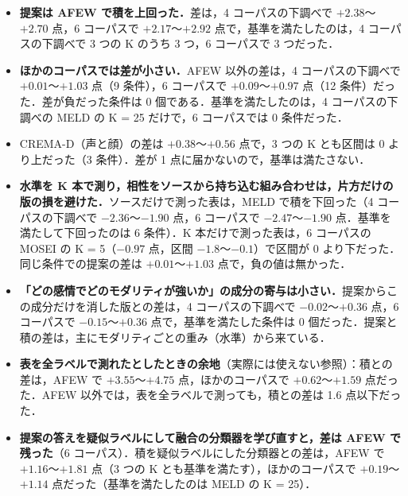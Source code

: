 \begin{itemize}
\item \textbf{提案は AFEW で積を上回った．}差は，4 コーパスの下調べで $+2.38$〜$+2.70$ 点，6 コーパスで $+2.17$〜$+2.92$ 点で，基準を満たしたのは，4 コーパスの下調べで 3 つの K のうち 3 つ，6 コーパスで 3 つだった．
\item \textbf{ほかのコーパスでは差が小さい．}AFEW 以外の差は，4 コーパスの下調べで $+0.01$〜$+1.03$ 点（9 条件），6 コーパスで $+0.09$〜$+0.97$ 点（12 条件）だった．差が負だった条件は 0 個である．基準を満たしたのは，4 コーパスの下調べの MELD の K = 25 だけで，6 コーパスでは 0 条件だった．
\item CREMA-D（声と顔）の差は $+0.38$〜$+0.56$ 点で，3 つの K とも区間は 0 より上だった（3 条件）．差が 1 点に届かないので，基準は満たさない．
\item \textbf{水準を K 本で測り，相性をソースから持ち込む組み合わせは，片方だけの版の損を避けた．}ソースだけで測った表は，MELD で積を下回った（4 コーパスの下調べで $-2.36$〜$-1.90$ 点，6 コーパスで $-2.47$〜$-1.90$ 点．基準を満たして下回ったのは 6 条件）．K 本だけで測った表は，6 コーパスの MOSEI の K = 5（$-0.97$ 点，区間 $-1.8$〜$-0.1$）で区間が 0 より下だった．同じ条件での提案の差は $+0.01$〜$+1.03$ 点で，負の値は無かった．
\item \textbf{「どの感情でどのモダリティが強いか」の成分の寄与は小さい．}提案からこの成分だけを消した版との差は，4 コーパスの下調べで $-0.02$〜$+0.36$ 点，6 コーパスで $-0.15$〜$+0.36$ 点で，基準を満たした条件は 0 個だった．提案と積の差は，主にモダリティごとの重み（水準）から来ている．
\item \textbf{表を全ラベルで測れたとしたときの余地}（実際には使えない参照）：積との差は，AFEW で $+3.55$〜$+4.75$ 点，ほかのコーパスで $+0.62$〜$+1.59$ 点だった．AFEW 以外では，表を全ラベルで測っても，積との差は 1.6 点以下だった．
\item \textbf{提案の答えを疑似ラベルにして融合の分類器を学び直すと，差は AFEW で残った}（6 コーパス）．積を疑似ラベルにした分類器との差は，AFEW で $+1.16$〜$+1.81$ 点（3 つの K とも基準を満たす），ほかのコーパスで $+0.19$〜$+1.14$ 点だった（基準を満たしたのは MELD の K = 25）．
\end{itemize}
